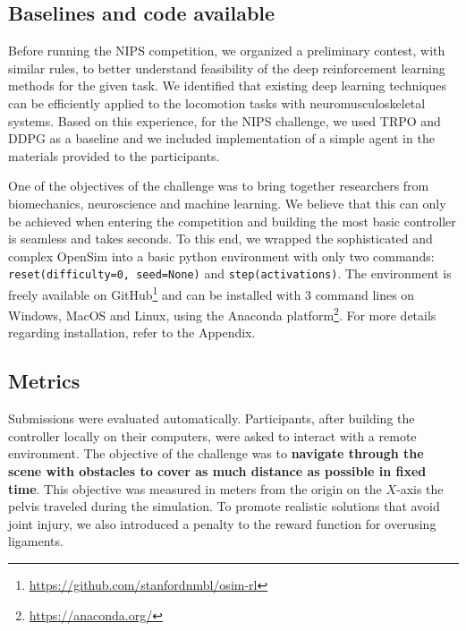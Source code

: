 \documentclass[graybox]{svmult}
\begin{document}
\subsection{Baselines and code available}

Before running the NIPS competition, we organized a preliminary contest, with similar rules, to better understand feasibility of the deep reinforcement learning methods for the given task. We identified that existing deep learning techniques can be efficiently applied to the locomotion tasks with neuromusculoskeletal systems. Based on this experience, for the NIPS challenge, we used TRPO and DDPG as a baseline and we included implementation of a simple agent in the materials provided to the participants.

One of the objectives of the challenge was to bring together researchers from biomechanics, neuroscience and machine learning. We believe that this can only be achieved when entering the competition and building the most basic controller is seamless and takes seconds. To this end, we wrapped the sophisticated and complex OpenSim into a basic python environment with only two commands: \verb|reset(difficulty=0, seed=None)| and \verb|step(activations)|. The environment is freely available on GitHub\footnote{\url{https://github.com/stanfordnmbl/osim-rl}} and can be installed with 3 command lines on Windows, MacOS and Linux, using the Anaconda platform\footnote{\url{https://anaconda.org/}}. For more details regarding installation, refer to the Appendix.

\subsection{Metrics}
Submissions were evaluated automatically. Participants, after building the controller locally on their computers, were asked to interact with a remote environment. The objective of the challenge was to \textbf{navigate through the scene with obstacles to cover as much distance as possible in fixed time}. This objective was measured in meters from the origin on the $X$-axis the pelvis traveled during the simulation. To promote realistic solutions that avoid joint injury, we also introduced a penalty to the reward function for overusing ligaments.
\end{document}
